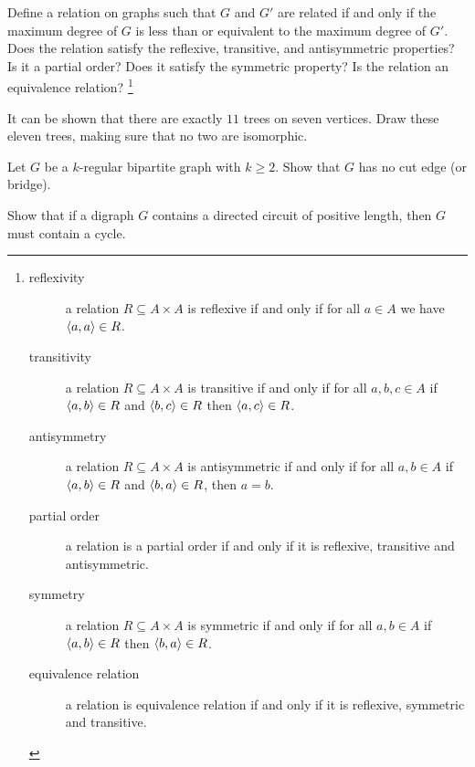 \documentclass{article}
\begin{document}
\begin{exercise}
Define a relation on graphs such that $G$ and $G'$ are related if and only if the maximum degree of $G$ is less than or equivalent to the maximum degree of $G'$. Does the relation satisfy the reflexive, transitive, and antisymmetric properties? Is it a partial order? Does it satisfy the symmetric property? Is the relation an equivalence relation?
\footnote{\begin{description}
 \item[reflexivity] a relation $R\subseteq A\times A$ is reflexive if and only if for all $a\in A$ we have $\left\langle a,a \right\rangle\in R$.
 \item[transitivity] a relation $R\subseteq A\times A$ is transitive if and only if for all $a,b,c\in A$ if $\left\langle a,b \right\rangle\in R$ and $\left\langle b,c \right\rangle\in R$ then $\left\langle a,c \right\rangle\in R$.
 \item[antisymmetry] a relation $R\subseteq A\times A$ is antisymmetric if and only if for all $a,b\in A$ if $\left\langle a,b \right\rangle\in R$ and $\left\langle b,a \right\rangle\in R$, then $a=b$.
 \item[partial order] a relation is a partial order if and only if it is reflexive, transitive and antisymmetric.
 \item[symmetry] a relation $R\subseteq A\times A$ is symmetric if and only if for all $a,b\in A$ if $\left\langle a,b \right\rangle\in R$ then $\left\langle b,a \right\rangle\in R$.
 \item[equivalence relation] a relation is equivalence relation if and only if it is reflexive, symmetric and transitive.
\end{description}}
\end{exercise}

\begin{exercise}
It can be shown that there are exactly $11$ trees on seven vertices. Draw these eleven trees, making sure that no two are isomorphic.
\end{exercise}

\begin{exercise}
Let $G$ be a $k$-regular bipartite graph with $k\geq2$. Show that $G$ has no cut edge (or bridge).
\end{exercise}

\begin{exercise}
Show that if a digraph $G$ contains a directed circuit of positive length, then $G$ must contain a cycle.
\end{exercise}
\end{document}
